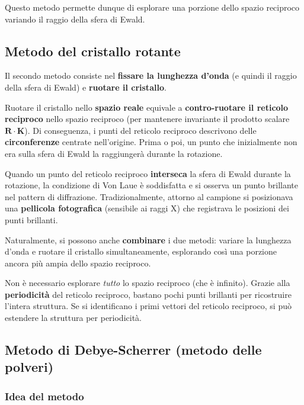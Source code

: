 Questo metodo permette dunque di esplorare una porzione dello spazio reciproco variando il raggio della sfera di Ewald.

\subsection*{Metodo del cristallo rotante}

Il secondo metodo consiste nel \textbf{fissare la lunghezza d'onda} (e quindi il raggio della sfera di Ewald) e \textbf{ruotare il cristallo}.

Ruotare il cristallo nello \textbf{spazio reale} equivale a \textbf{contro-ruotare il reticolo reciproco} nello spazio reciproco (per mantenere invariante il prodotto scalare $\mathbf{R} \cdot \mathbf{K}$). Di conseguenza, i punti del reticolo reciproco descrivono delle \textbf{circonferenze} centrate nell'origine. Prima o poi, un punto che inizialmente non era sulla sfera di Ewald la raggiungerà durante la rotazione.

Quando un punto del reticolo reciproco \textbf{interseca} la sfera di Ewald durante la rotazione, la condizione di Von Laue è soddisfatta e si osserva un punto brillante nel pattern di diffrazione. Tradizionalmente, attorno al campione si posizionava una \textbf{pellicola fotografica} (sensibile ai raggi X) che registrava le posizioni dei punti brillanti.

Naturalmente, si possono anche \textbf{combinare} i due metodi: variare la lunghezza d'onda e ruotare il cristallo simultaneamente, esplorando così una porzione ancora più ampia dello spazio reciproco.

\begin{nota}
Non è necessario esplorare \textit{tutto} lo spazio reciproco (che è infinito). Grazie alla \textbf{periodicità} del reticolo reciproco, bastano pochi punti brillanti per ricostruire l'intera struttura. Se si identificano i primi vettori del reticolo reciproco, si può estendere la struttura per periodicità.
\end{nota}

\subsection*{Metodo di Debye-Scherrer (metodo delle polveri)}

\subsubsection*{Idea del metodo}

